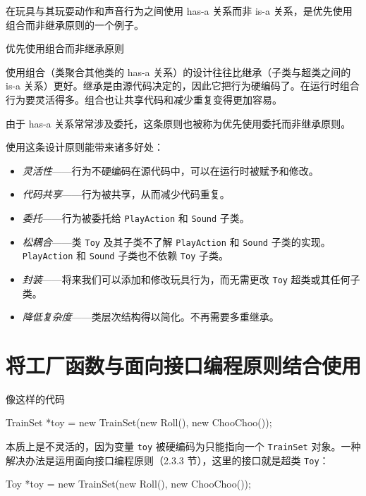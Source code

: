 在玩具与其玩耍动作和声音行为之间使用 has-a 关系而非 is-a 关系，是优先使用组合而非继承原则的一个例子。

\begin{mySidebar}{优先使用组合而非继承原则}

使用组合（类聚合其他类的 has-a 关系）的设计往往比继承（子类与超类之间的 is-a 关系）更好。继承是由源代码决定的，因此它把行为硬编码了。在运行时组合行为要灵活得多。组合也让共享代码和减少重复变得更加容易。

由于 has-a 关系常常涉及委托，这条原则也被称为优先使用委托而非继承原则。
\end{mySidebar}

使用这条设计原则能带来诸多好处：

\begin{itemize}
\item \emph{灵活性}——行为不硬编码在源代码中，可以在运行时被赋予和修改。
\item \emph{代码共享}——行为被共享，从而减少代码重复。
\item \emph{委托}——行为被委托给 \texttt{Play\allowbreak{}Action} 和 \texttt{Sound} 子类。
\item \emph{松耦合}——类 \texttt{Toy} 及其子类不了解 \texttt{Play\allowbreak{}Action} 和 \texttt{Sound} 子类的实现。\texttt{Play\allowbreak{}Action} 和 \texttt{Sound} 子类也不依赖 \texttt{Toy} 子类。
\item \emph{封装}——将来我们可以添加和修改玩具行为，而无需更改 \texttt{Toy} 超类或其任何子类。
\item \emph{降低复杂度}——类层次结构得以简化。不再需要多重继承。
\end{itemize}


\section{将工厂函数与面向接口编程原则结合使用}

像这样的代码

\begin{codebox}
TrainSet *toy = new TrainSet(new Roll(), new ChooChoo());
\end{codebox}

本质上是不灵活的，因为变量 \texttt{toy} 被硬编码为只能指向一个 \texttt{TrainSet} 对象。一种解决办法是运用面向接口编程原则（2.3.3 节），这里的接口就是超类 \texttt{Toy}：

\begin{codebox}
Toy *toy = new TrainSet(new Roll(), new ChooChoo());
\end{codebox}

